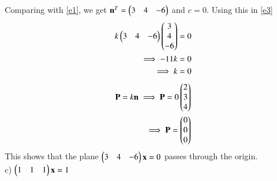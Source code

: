 \documentclass[journal,12pt,twocolumn]{IEEEtran}
\begin{document}
Comparing with \eqref{e1}, we get $\mathbf{n}^T = \begin{pmatrix}3&4&-6\end{pmatrix}$ and  $c=0$. Using this in \eqref{e3}
\begin{align}
	k\begin{pmatrix}3&4&-6\end{pmatrix}\begin{pmatrix}3\\4\\-6\end{pmatrix} = 0\\
	\implies -11k = 0\\
	\implies k = 0
\end{align}
\begin{align}
	\mathbf{P} = k\mathbf{n}
	\implies\mathbf{P} = 0\begin{pmatrix}2\\3\\4\end{pmatrix}\\
	\implies\mathbf{P}= \begin{pmatrix}0\\0\\0\end{pmatrix}
\end{align}
This shows that the plane $\begin{pmatrix}3&4&-6\end{pmatrix}\mathbf{x} = 0$ passes through the origin.\\

c) $\begin{pmatrix}1&1&1\end{pmatrix}\mathbf{x} = 1$\\
\end{document}

